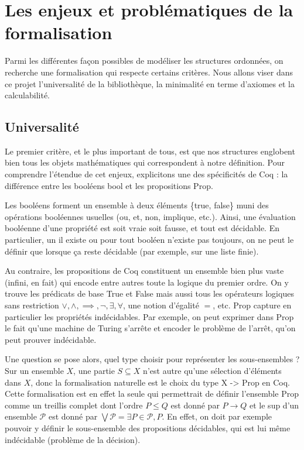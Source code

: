 \documentclass{article}
\newcommand\code[1]{{\fontfamily{lmtt}\selectfont #1}}
\theoremstyle{definition}
\begin{document}

\section{Les enjeux et problématiques de la formalisation}

Parmi les différentes façon possibles de modéliser les structures ordonnées, on recherche une formalisation qui respecte certains critères. Nous allons viser dans ce projet l'universalité de la bibliothèque, la minimalité en terme d'axiomes et la calculabilité.

\subsection{Universalité}
\label{universalite}

Le premier critère, et le plus important de tous, est que nos structures englobent bien tous les objets mathématiques qui correspondent à notre définition. Pour comprendre l'étendue de cet enjeux, explicitons une des spécificités de Coq : la différence entre les booléens \code{bool} et les propositions \code{Prop}.

Les booléens forment un ensemble à deux éléments \{\code{true}, \code{false}\} muni des opérations booléennes usuelles (\og ou\fg{}, \og et\fg{}, \og non\fg{}, \og implique\fg{}, etc.). Ainsi, une évaluation booléenne d'une propriété est soit vraie soit fausse, et tout est décidable. En particulier, un \og il existe\fg{} ou \og pour tout\fg{} booléen n'existe pas toujours, on ne peut le définir que lorsque ça reste décidable (par exemple, sur une liste finie).

Au contraire, les propositions de Coq constituent un ensemble bien plus vaste
(infini, en fait) qui encode entre autres toute la logique du premier ordre. On
y trouve les prédicats de base \code{True} et \code{False} mais aussi tous les
opérateurs logiques sans restriction $\lor,\land, \implies, \neg, \exists,
\forall$, une notion d'égalité $=$, etc. \code{Prop} capture en particulier les propriétés indécidables. Par exemple, on peut exprimer dans \code{Prop} le fait qu'une machine de Turing s'arrête et encoder le problème de l'arrêt, qu'on peut prouver indécidable.

\medskip

Une question se pose alors, quel type choisir pour représenter les
sous-ensembles ? Sur un ensemble $X$, une partie $S \subseteq X$ n'est autre
qu'une sélection d'éléments dans $X$, donc la formalisation naturelle est le
choix du type \code{X -> Prop} en Coq. Cette formalisation est en effet la seule
qui permettrait de définir l'ensemble \code{Prop} comme un treillis complet dont
l'ordre $P \leq Q$ est donné par $P \rightarrow Q$ et le sup d'un ensemble
$\mathcal{P}$ est donné par $\bigvee \mathcal{P} = \exists P \in \mathcal{P},
P$. En effet, on doit par exemple pouvoir y définir le sous-ensemble des propositions décidables, qui est lui même indécidable (problème de la décision).
\end{document}
